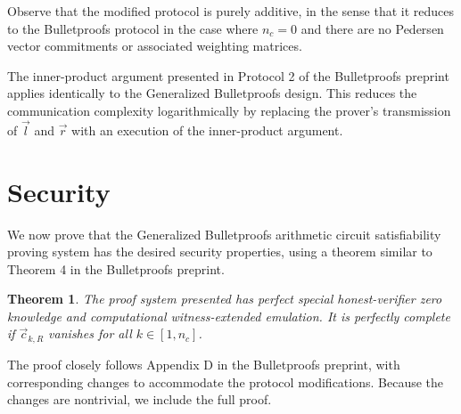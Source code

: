 \documentclass{article}
\newtheorem*{theorem}{Theorem}
\begin{document}
Observe that the modified protocol is purely additive, in the sense that it reduces to the Bulletproofs protocol in the case where $n_c = 0$ and there are no Pedersen vector commitments or associated weighting matrices.

The inner-product argument presented in Protocol 2 of the Bulletproofs preprint applies identically to the Generalized Bulletproofs design.
This reduces the communication complexity logarithmically by replacing the prover's transmission of $\vec{l}$ and $\vec{r}$ with an execution of the inner-product argument.


\section{Security}

We now prove that the Generalized Bulletproofs arithmetic circuit satisfiability proving system has the desired security properties, using a theorem similar to Theorem 4 in the Bulletproofs preprint.

\begin{theorem}
	The proof system presented has perfect special honest-verifier zero knowledge and computational witness-extended emulation.
	It is perfectly complete if $\vec{c}_{k,R}$ vanishes for all $k \in [1, n_c]$.
\end{theorem}

The proof closely follows Appendix D in the Bulletproofs preprint, with corresponding changes to accommodate the protocol modifications.
Because the changes are nontrivial, we include the full proof.
\end{document}
